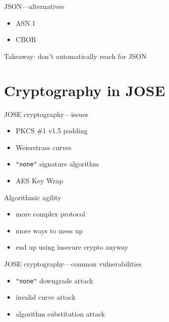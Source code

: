 \documentclass[ignorenonframetext,aspectratio=43]{beamer}
\providecommand{\tightlist}{%
  \setlength{\itemsep}{0pt}\setlength{\parskip}{0pt}}
\begin{document}
\begin{frame}[plain]
\begin{center}
\end{center}
\end{frame}

\begin{frame}{JSON---alternatives}
\begin{itemize}
\tightlist
\item ASN.1
\item CBOR
\end{itemize}
\end{frame}

\begin{frame}[plain]
\huge
Takeaway: don't automatically reach for JSON
\end{frame}






\section{Cryptography in JOSE}

\begin{frame}{JOSE cryptography---issues}
\begin{itemize}
\tightlist
\item PKCS \#1 v1.5 padding
\item Weierstrass curves
\item {\tt "none"} signature algorithm
\item AES Key Wrap
\end{itemize}
\end{frame}

\begin{frame}{Algorithmic agility}
\begin{itemize}
\tightlist
\item more complex protocol
\item more ways to mess up
\item end up using insecure crypto anyway
\end{itemize}
\end{frame}

\begin{frame}{JOSE cryptography---common vulnerabilities}
\begin{itemize}
\tightlist
\item {\tt "none"} downgrade attack
\item invalid curve attack
\item algorithm substitution attack
\end{itemize}
\end{frame}
\end{document}
